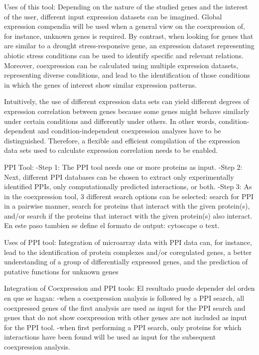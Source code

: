 \documentclass[a4paper,10pt]{article}
\begin{document}
\begin{itemize}
Uses of this tool:
Depending on the nature of the studied genes and the interest of the user, different input expression datasets can be imagined. 
Global expression compendia will be used when a general view on the coexpression of, for instance, unknown genes is required. 
By contrast, when looking for genes that are similar to a drought stress-responsive gene, an expression dataset representing abiotic stress conditions can be used to identify specific and relevant relations. 
Moreover, coexpression can be calculated using multiple expression datasets, representing diverse conditions, and lead to the identification of those conditions in which the genes of interest show similar expression patterns.

Intuitively, the use of different expression data sets can yield different degrees of expression correlation between genes because some genes might behave similarly under certain conditions and differently under others.
In other words, condition-dependent and condition-independent coexpression analyses have to be distinguished. 
Therefore, a flexible and efficient compilation of the expression data sets used to calculate expression correlation needs to be enabled.

PPI Tool:
-Step 1: The PPI tool needs one or more proteins as input.
-Step 2: Next, different PPI databases can be chosen to extract only experimentally identified PPIs, only computationally predicted interactions, or both.
-Step 3: As in the coexpression tool, 3 different search options can be selected: search for PPI in a pairwise manner, search for proteins that interact with the given protein(s), 
and/or search if the proteins that interact with the given protein(s) also interact. 
En este paso tambien se define el formato de output: cytoscape o text.

Uses of PPI tool:
Integration of microarray data with PPI data can, for instance, lead to the identification of protein complexes and/or coregulated genes, 
a better understanding of a group of differentially expressed genes, and the prediction of putative functions for unknown genes

Integration of Coexpression and PPI tools:
El resultado puede depender del orden en que se hagan:
-when a coexpression analysis is followed by a PPI search, all coexpressed genes of the first analysis are used as input for the PPI search and genes that do not show coexpression with other genes are not included as input for the PPI tool. 
-when first performing a PPI search, only proteins for which interactions have been found will be used as input for the subsequent coexpression analysis.




\end{itemize}
\end{document}
